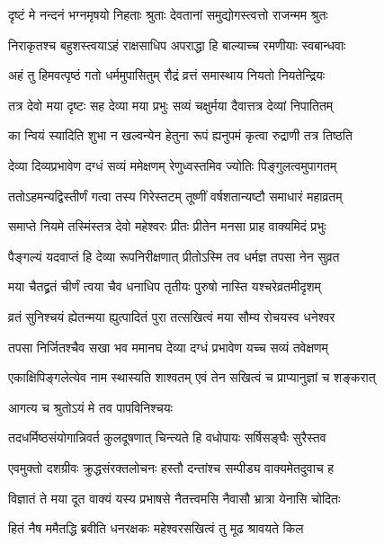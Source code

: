 \twolineshloka
{दृष्टं मे नन्दनं भग्नमृषयो निहताः श्रुताः}
{देवतानां समुद्योगस्त्वत्तो राजन्मम श्रुतः} %

\twolineshloka
{निराकृतश्च बहुशस्त्वयाऽहं राक्षसाधिप}
{अपराद्धा हि बाल्याच्च रमणीयाः स्वबान्धवाः} %

\twolineshloka
{अहं तु हिमवत्पृष्ठं गतो धर्ममुपासितुम्}
{रौद्रं व्रत्तं समास्थाय नियतो नियतेन्द्रियः} %

\twolineshloka
{तत्र देवो मया दृष्टः सह देव्या मया प्रभुः}
{सव्यं चक्षुर्मया दैवात्तत्र देव्यां निपातितम्} %

\twolineshloka
{का न्वियं स्यादिति शुभा न खल्वन्येन हेतुना}
{रूपं ह्यनुपमं कृत्वा रुद्राणी तत्र तिष्ठति} %

\twolineshloka
{देव्या दिव्यप्रभावेण दग्धं सव्यं ममेक्षणम्}
{रेणुध्वस्तमिव ज्योतिः पिङ्गुलत्वमुपागतम्} %

\twolineshloka
{ततोऽहमन्यद्विस्तीर्णं गत्वा तस्य गिरेस्तटम्}
{तूष्णीं वर्षशतान्यष्टौ समाधारं महाव्रतम्} %

\twolineshloka
{समाप्ते नियमे तस्मिंस्तत्र देवो महेश्वरः}
{प्रीतः प्रीतेन मनसा प्राह वाक्यमिदं प्रभुः} %

\twolineshloka
{पैङ्गल्यं यदवाप्तं हि देव्या रूपनिरीक्षणात्}
{प्रीतोऽस्मि तव धर्मज्ञ तपसा नेन सुव्रत} %

\twolineshloka
{मया चैतद्व्रतं चीर्णं त्वया चैव धनाधिप}
{तृतीयः पुरुषो नास्ति यश्चरेव्रतमीदृशम्} %

\twolineshloka
{व्रतं सुनिश्चयं ह्येतन्मया ह्युत्पादितं पुरा}
{तत्सखित्वं मया सौम्य रोचयस्व धनेश्वर} %

\twolineshloka
{तपसा निर्जितश्चैव सखा भव ममानघ}
{देव्या दग्धं प्रभावेण यच्च सव्यं तवेक्षणम्} %

\twolineshloka
{एकाक्षिपिङ्गलेत्येव नाम स्थास्यति शाश्वतम्}
{एवं तेन सखित्वं च प्राप्यानुज्ञां च शङ्करात्} %

\onelineshloka
{आगत्य च श्रुतोऽयं मे तव पापविनिश्चयः} %

\twolineshloka
{तदधर्मिष्ठसंयोगान्निवर्त कुलदूषणात्}
{चिन्त्यते हि वधोपायः सर्षिसङ्घैः सुरैस्तव} %

\twolineshloka
{एवमुक्तो दशग्रीवः क्रुद्धसंरक्तलोचनः}
{हस्तौ दन्तांश्च सम्पीड्य वाक्यमेतदुवाच ह} %

\twolineshloka
{विज्ञातं ते मया दूत वाक्यं यस्य प्रभाषसे}
{नैतत्त्वमसि नैवासौ भ्रात्रा येनासि चोदितः} %

\twolineshloka
{हितं नैष ममैतद्धि ब्रवीति धनरक्षकः}
{महेश्वरसखित्वं तु मूढ श्रावयते किल} %

